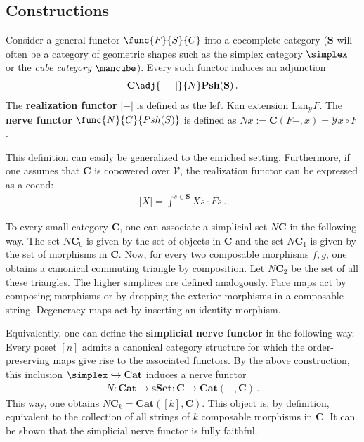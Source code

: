 \subsection{Constructions}

    \begin{construct}\label{model:nerve_and_realization}
        Consider a general functor $\func{F}{S}{C}$ into a cocomplete category ($\mathbf{S}$ will often be a category of geometric shapes such as the simplex category $\simplex$ or the \textit{cube category} $\mbox{\mancube}$). Every such functor induces an adjunction
        \begin{gather}
            \mathbf{C}\adj{|-|}{N}\mathbf{Psh}(\mathbf{S})\,.
        \end{gather}
        The \textbf{realization functor} $|-|$ is defined as the left Kan extension $\mathrm{Lan}_{\mathcal{Y}}F$. The \textbf{nerve functor} $\func{N}{C}{Psh(S)}$ is defined as $Nx:=\mathbf{C}(F-,x)=\mathcal{Y}x\circ F$.

        This definition can easily be generalized to the enriched setting. Furthermore, if one assumes that $\mathbf{C}$ is copowered over $\mathcal{V}$, the realization functor can be expressed as a coend:
        \begin{gather}
            |X| = \int^{s\in\mathbf{S}}Xs\cdot Fs\,.
        \end{gather}
    \end{construct}

    \begin{example}\label{model:nerve}
        To every small category $\mathbf{C}$, one can associate a simplicial set $N\mathbf{C}$ in the following way. The set $N\mathbf{C}_0$ is given by the set of objects in $\mathbf{C}$ and the set $N\mathbf{C}_1$ is given by the set of morphisms in $\mathbf{C}$. Now, for every two composable morphisms $f,g$, one obtains a canonical commuting triangle by composition. Let $N\mathbf{C}_2$ be the set of all these triangles. The higher simplices are defined analogously. Face maps act by composing morphisms or by dropping the exterior morphisms in a composable string. Degeneracy maps act by inserting an identity morphism.

        Equivalently, one can define the \textbf{simplicial nerve functor} in the following way. Every poset $[n]$ admits a canonical category structure for which the order-preserving maps give rise to the associated functors. By the above construction, this inclusion $\simplex\hookrightarrow\mathbf{Cat}$ induces a nerve functor
        \begin{gather}
            N:\mathbf{Cat}\rightarrow\mathbf{sSet}:\mathbf{C}\mapsto\mathbf{Cat}(-,\mathbf{C})\,.
        \end{gather}
        This way, one obtains $N\mathbf{C}_k=\mathbf{Cat}([k], \mathbf{C})$. This object is, by definition, equivalent to the collection of all strings of $k$ composable morphisms in $\mathbf{C}$. It can be shown that the simplicial nerve functor is fully faithful.
    \end{example}

